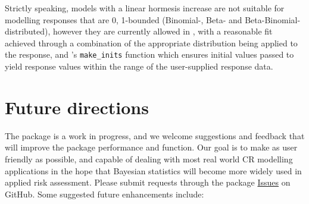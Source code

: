 \documentclass[
  shortnames]{jss}
\begin{document}
Strictly speaking, models with a linear hormesis increase are not suitable for modelling responses that are 0, 1-bounded (Binomial-, Beta- and Beta-Binomial-distributed), however they are currently allowed in , with a reasonable fit achieved through a combination of the appropriate distribution being applied to the response, and 's \texttt{make\_inits} function which ensures initial values passed to  yield response values within the range of the user-supplied response data.

\hypertarget{future-directions}{%
\section{Future directions}\label{future-directions}}

The  package is a work in progress, and we welcome suggestions and feedback that will improve the package performance and function. Our goal is to make  as user friendly as possible, and capable of dealing with most real world CR modelling applications in the hope that Bayesian statistics will become more widely used in applied risk assessment. Please submit requests through the package \href{https://github.com/open-AIMS/bayesnec/issues}{Issues} on GitHub. Some suggested future enhancements include:
\end{document}
